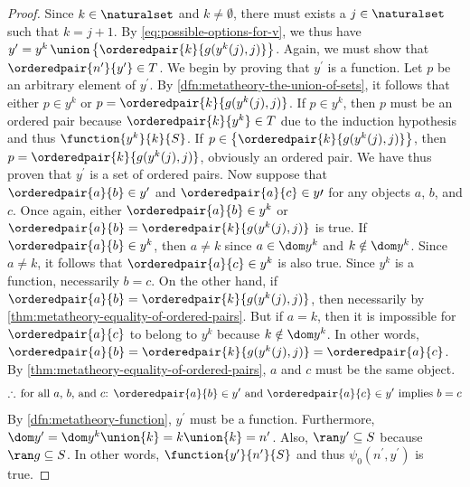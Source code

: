 \begin{proof}
    \vspace{0.1cm}
    \noindent
    Since \( k \in \naturalset \) and \( k \neq \emptyset \), there must exists a \( j \in \naturalset \) such that \( k = j + 1 \).
    By \eqref{eq:possible-options-for-v}, we thus have \( y^{\prime} = y^{k} \,{\union}\, \mleft\{ \orderedpair{k}{g(y^{k}(j), j)} \mright\} \).
    Again, we must show that \( \orderedpair{n^{\prime}}{y^{\prime}} \in T \).
    We begin by proving that \( y^{\prime} \) is a function.
    Let \( p \) be an arbitrary element of \( y^{\prime} \).
    By \cref{dfn:metatheory-the-union-of-sets}, it follows that either \( p \in y^{k} \) or \( p = \orderedpair{k}{g(y^{k}(j), j)} \).
    If \( p \in y^{k} \), then \( p \) must be an ordered pair because \( \orderedpair{k}{y^{k}} \in T \) due to the induction hypothesis
    and thus \( \function{y^{k}}{k}{S} \).
    If \( p \in \mleft\{ \orderedpair{k}{g(y^{k}(j), j)} \mright\} \), then \( p = \orderedpair{k}{g(y^{k}(j), j)}\), obviously an ordered pair.
    We have thus proven that \( y^{\prime} \) is a set of ordered pairs.
    Now suppose that \( \orderedpair{a}{b} \in y^{\prime} \) and \( \orderedpair{a}{c} \in y{\prime} \) for any objects \( a \), \( b \), and \( c \).
    Once again, either \( \orderedpair{a}{b} \in y^{k} \) or \( \orderedpair{a}{b} = \orderedpair{k}{g(y^{k}(j), j)} \) is true.
    If \( \orderedpair{a}{b} \in y^{k} \), then \( a \neq k \) since \( a \in \dom y^{k} \) and \( k \notin \dom y^{k} \).
    Since \( a \neq k \), it follows that \( \orderedpair{a}{c} \in y^{k} \) is also true.
    Since \( y^{k} \) is a function, necessarily \( b = c \).
    On the other hand, if \( \orderedpair{a}{b} = \orderedpair{k}{g(y^{k}(j), j)} \), then necessarily by
    \cref{thm:metatheory-equality-of-ordered-pairs}.
    But if \( a = k \), then it is impossible for \( \orderedpair{a}{c} \) to belong to \( y^{k} \) because \( k \notin \dom y^{k} \).
    In other words, \( \orderedpair{a}{b} = \orderedpair{k}{g(y^{k}(j), j)} = \orderedpair{a}{c} \).
    By \cref{thm:metatheory-equality-of-ordered-pairs}, \( a \) and \( c \) must be the same object.
    \begin{equation*}
        \therefore \, \text{for all \( a \), \( b \), and \( c \): \( \orderedpair{a}{b} \in y^{\prime} \) and \( \orderedpair{a}{c} \in y^{\prime} \) implies \( b = c \)}
    \end{equation*}
    By \cref{dfn:metatheory-function}, \( y^{\prime} \) must be a function.
    Furthermore, \( \dom y^{\prime} = \dom y^{k} \union \mleft\{ k \mright\} = k \union \mleft\{ k \mright\} = n^{\prime} \).
    Also, \( \ran y^{\prime} \subseteq S \) because \( \ran g \subseteq S \).
    In other words, \( \function{y^{\prime}}{n^{\prime}}{S} \) and thus \( \psi_{0}(n^{\prime}, y^{\prime}) \) is true.
    

\end{proof}
